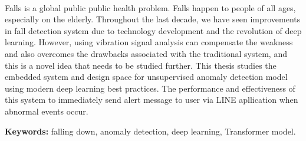 
\setlength{\parindent}{0pt}
\setlength{\parskip}{1em}
\setlength{\baselineskip}{1.6em}

\begin{center}
  \fontsize{14}{17}
\end{center}
\vspace{2em}

\paragraph{}
Falls is a global public public health problem. Falls happen to people of all ages, especially on the elderly. Throughout the last decade, we have seen improvements in fall detection system due to technology development and the revolution of deep learning. However, using vibration signal analysis can compensate the weakness and also overcomes the drawbacks associated with the traditional system, and this is a novel idea that needs to be studied further. This thesis studies the embedded system and design space for unsupervised anomaly detection model using modern deep learning best practices. The performance and effectiveness of this system to immediately send alert message to user via LINE apllication when abnormal events occur.


\textbf{Keywords:} falling down, anomaly detection, deep learning, Transformer model.